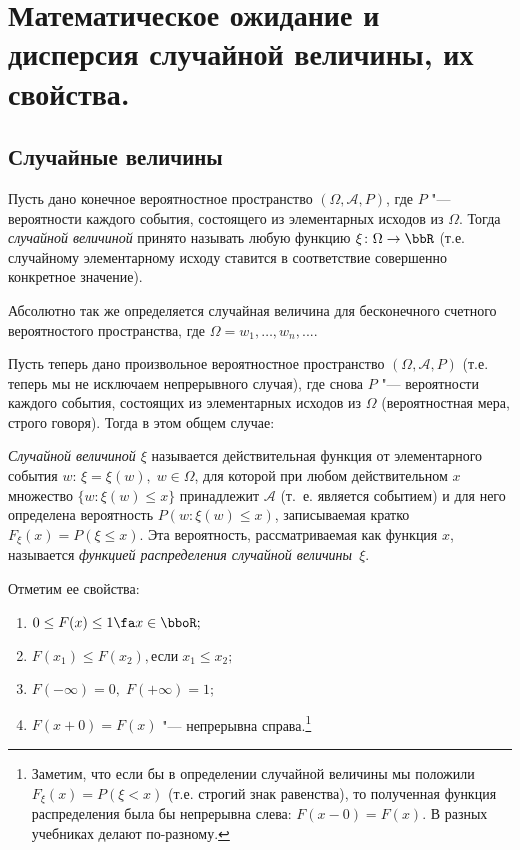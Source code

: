 \chapter{Математическое ожидание и дисперсия случайной величины, их свойства.}
\section{Случайные величины}

Пусть дано конечное вероятностное пространство $(\Omega,\mathcal A, P)$, где $P$ "--- вероятности каждого события, состоящего из элементарных исходов из $\Omega$. Тогда \textit{случайной величиной} принято называть любую функцию $\xi\colon \Omega \to \bbR$ (т.е. случайному элементарному исходу ставится в соответствие совершенно конкретное значение).

Абсолютно так же определяется случайная величина для бесконечного счетного вероятностого пространства, где $\Omega = {w_1,\dots, w_n,...}$.

Пусть теперь дано произвольное вероятностное пространство $(\Omega,\mathcal A, P)$ (т.е. теперь мы не исключаем непрерывного случая), где снова $P$ "--- вероятности каждого события, состоящих из элементарных исходов из $\Omega$ (вероятностная мера, строго говоря). Тогда в этом общем случае:
\begin{defn}
\textit{Случайной величиной $\xi$} называется действительная функция от элементарного события $w$: $\xi = \xi(w), \; w\in\Omega$, для которой при любом действительном $x$ множество $\{w: \xi(w) \le x\}$ принадлежит $\mathcal A$ (т.~е. является событием) и для него определена вероятность $P(w: \xi(w) \le x)$, записываемая кратко $F_\xi(x)=P(\xi \le x)$. Эта вероятность, рассматриваемая как функция $x$, называется \textit{функцией распределения случайной величины~$\xi$}.
\end{defn}
Отметим ее свойства:
\begin{enumerate}
\item 
$0 \le F(x) \le 1 \fa x \in \bboR;$ 
\item
$F(x_1) \le F(x_2), \text{если}\; x_1\le x_2;$
\item
$F(-\infty)=0, \; F(+\infty)=1;$
\item
$F(x+0)=F(x)$ "--- непрерывна справа.\footnote{Заметим, что если бы в определении случайной величины мы положили $F_\xi(x)=P(\xi < x)$ (т.е. строгий знак равенства), то полученная функция распределения была бы непрерывна слева: $F(x-0)=F(x)$. В разных учебниках делают по-разному.}
\end{enumerate}

